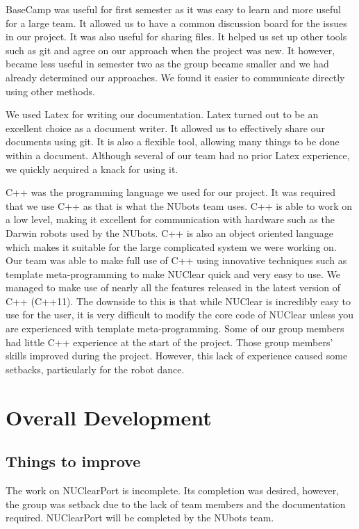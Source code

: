 \documentclass[english,12pt]{scrartcl}
\begin{document}
		BaseCamp was useful for first semester as it was easy to learn and more useful for a large team.
		It allowed us to have a common discussion board for the issues in our project.
		It was also useful for sharing files.
		It helped us set up other tools such as git and agree on our approach when the project was new.
		It however, became less useful in semester two as the group became smaller and we had already determined our approaches.
		We found it easier to communicate directly using other methods.

		We used Latex for writing our documentation.
		Latex turned out to be an excellent choice as a document writer.
		It allowed us to effectively share our documents using git.
		It is also a flexible tool, allowing many things to be done within a document.
		Although several of our team had no prior Latex experience, we quickly acquired a knack for using it.

		C++ was the programming language we used for our project.
		It was required that we use C++ as that is what the NUbots team uses.
		C++ is able to work on a low level, making it excellent for communication with hardware such as the Darwin robots used by the NUbots.
		C++ is also an object oriented language which makes it suitable for the large complicated system we were working on.
		Our team was able to make full use of C++ using innovative techniques such as template meta-programming to make NUClear quick and very easy to use.
		We managed to make use of nearly all the features released in the latest version of C++ (C++11).
		The downside to this is that while NUClear is incredibly easy to use for the user, it is very difficult to modify the core code of NUClear unless you are experienced with template meta-programming.
		Some of our group members had little C++ experience at the start of the project.
		Those group members’ skills improved during the project.
		However, this lack of experience caused some setbacks, particularly for the robot dance.

\section{Overall Development}
	\subsection{Things to improve}
		The work on NUClearPort is incomplete.
		Its completion was desired, however, the group was setback due to the lack of team members and the documentation required.
		NUClearPort will be completed by the NUbots team.
\end{document}
